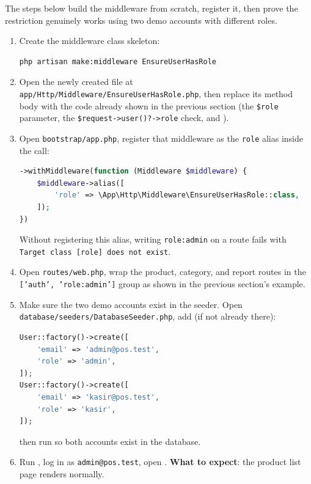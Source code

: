 The steps below build the  middleware from
scratch, register it, then prove the restriction genuinely works using
two demo accounts with different roles.

\begin{enumerate}
  \item Create the middleware class skeleton:
    \begin{lstlisting}[language=bash]
php artisan make:middleware EnsureUserHasRole
    \end{lstlisting}
  \item Open the newly created file at
    \texttt{app/Http\allowbreak/Middleware\allowbreak/EnsureUserHasRole.php}, then
    replace its  method body with the code already shown
    in the previous section (the \texttt{\$role} parameter, the
    \texttt{\$request->user()?->role} check, and
    ).
  \item Open \texttt{bootstrap/app.php}, register that middleware as
    the \texttt{role} alias inside the  call:
    \begin{lstlisting}[language=php, title=\lstfile{bootstrap/app.php}]
->withMiddleware(function (Middleware $middleware) {
    $middleware->alias([
        'role' => \App\Http\Middleware\EnsureUserHasRole::class,
    ]);
})
    \end{lstlisting}
    Without registering this alias, writing \texttt{role:admin} on a
    route fails with \texttt{Target class [role] does not exist}.
  \item Open \texttt{routes/web.php}, wrap the product, category, and
    report routes in the \texttt{['auth', 'role:admin']} group as
    shown in the previous section's example.
  \item Make sure the two demo accounts exist in the seeder. Open
    \texttt{database/seeders/DatabaseSeeder.php}, add (if not already
    there):
    \begin{lstlisting}[language=php, title=\lstfile{database/seeders/DatabaseSeeder.php}]
User::factory()->create([
    'email' => 'admin@pos.test',
    'role' => 'admin',
]);
User::factory()->create([
    'email' => 'kasir@pos.test',
    'role' => 'kasir',
]);
    \end{lstlisting}
    then run  so both
    accounts exist in the database.
  \item Run , log in as
    \texttt{admin@pos.test}, open . \textbf{What to
    expect}: the product list page renders normally.

\end{enumerate}
